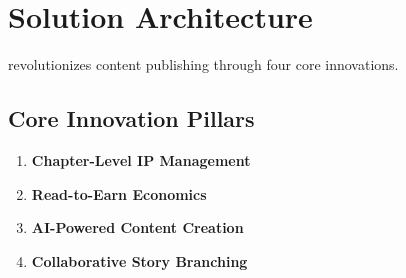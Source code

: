\section{Solution Architecture}
\label{sec:solution-architecture}

\storyhouse{} revolutionizes content publishing through four core innovations.

\subsection{Core Innovation Pillars}

\begin{enumerate}
    \item \textbf{Chapter-Level IP Management}
    \item \textbf{Read-to-Earn Economics}
    \item \textbf{AI-Powered Content Creation}
    \item \textbf{Collaborative Story Branching}
\end{enumerate}

